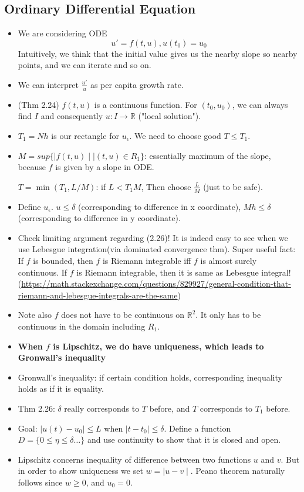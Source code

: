 \documentclass{article}
\theoremstyle{remark}
\begin{document}
\subsection*{Ordinary Differential Equation}
\begin{itemize}
    \item We are considering ODE $$u'=f(t,u), u(t_0)=u_0$$
    Intuitively, we think that the initial value gives us the nearby slope so nearby points, and we can iterate and so on.
    \item We can interpret $\frac {u'}u$ as per capita growth rate.
    \item (Thm 2.24) $f(t,u)$ is a continuous function. For $(t_0, u_0)$, we can always find $I$ and consequently $u:I\to\mathbb{R}$ ("local solution").
    \item $T_1=Nh$ is our rectangle for $u_\epsilon$. We need to choose good $T\leq T_1$. 
    \item $M=sup\{\mid f(t,u)\mid\mid (t,u)\in R_1\}$: essentially maximum of the slope, because $f$ is given by a slope in ODE. 
    
    $T=\min (T_1, L/M)$: if $L<T_1 M$, Then choose $\frac LM$ (just to be safe).
    \item Define $u_\epsilon$. $u\leq \delta$ (corresponding to difference in x coordinate), $Mh\leq \delta$ (corresponding to difference in y coordinate).
    \item Check limiting argument regarding (2.26)!
    It is indeed easy to see when we use Lebesgue integration(via dominated convergence thm). Super useful fact: If $f$ is bounded, then $f$ is Riemann integrable iff $f$ is almost surely continuous. If $f$ is Riemann integrable, then it is same as Lebesgue integral! (\url{https://math.stackexchange.com/questions/829927/general-condition-that-riemann-and-lebesgue-integrals-are-the-same})
    \item Note also $f$ does not have to be continuous on $\mathbb{R}^2$. It only has to be continuous in the domain including $R_1$.
    \item \textbf{When $f$ is Lipschitz, we do have uniqueness, which leads to Gronwall's inequality}
    \item Gronwall's inequality: if certain condition holds, corresponding inequality holds as if it is equality.
    \item Thm 2.26: $\delta$ really corresponds to $T$ before, and $T$ corresponds to $T_1$ before.
    \item Goal: $\mid u(t)-u_0\mid \leq L$ when $\mid t-t_0\mid\leq \delta$. Define a function $D=\{0\leq \eta\leq\delta\dots\}$ and use continuity to show that it is closed and open.
    \item Lipschitz concerns inequality of difference between two functions $u$ and $v$. But in order to show uniqueness we set $w=\mid u-v\mid$. Peano theorem naturally follows since $w\geq 0$, and $u_0=0$.
    








    
\end{itemize}
\end{document}
